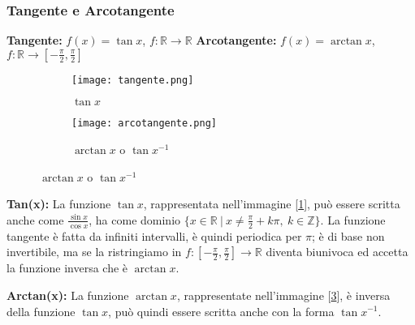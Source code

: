 \subsubsection{Tangente e Arcotangente}
\textbf{Tangente:} $f(x) = \tan{x}$, $f: \mathbb{R} \longrightarrow \mathbb{R}$ \hfill
\textbf{Arcotangente:} $f(x) = \arctan{x}$, $f: \mathbb{R} \longrightarrow [-\frac{\pi}{2}, \frac{\pi}{2}]$
\begin{figure}[h!]
    \begin{subfigure}{.5\textwidth}
        \vspace{-20pt}
        \centering
        \texttt{[image: tangente.png]}
        \vspace{-20pt}
        \caption{$\tan{x}$}
        \label{fig:tangente}
    \end{subfigure}
    \begin{subfigure}{.5\textwidth}
        \centering
        \texttt{[image: arcotangente.png]}
        \caption{$\arctan{x}$ o $\tan{x}^{-1}$}
        \label{fig:arcotangente}
    \end{subfigure}
\end{figure}
\begin{observation}
    \textbf{Tan(x):} La funzione $\tan{x}$, rappresentata nell'immagine [\ref{fig:tangente}], può essere scritta anche come $\frac{\sin{x}}{\cos{x}}$, ha come dominio $\{x \in \mathbb{R} \: | \:  x \neq \frac{\pi}{2} + k\pi, \: k \in \mathbb{Z}\}$. La funzione tangente è fatta da infiniti intervalli, è quindi periodica per $\pi$; è di base non invertibile, ma se la ristringiamo in $f: [-\frac{\pi}{2}, \frac{\pi}{2}] \longrightarrow \mathbb{R}$ diventa biunivoca ed accetta la funzione inversa che è $\arctan{x}$.
\end{observation}
\begin{observation}
    \textbf{Arctan(x):} La funzione $\arctan{x}$, rappresentate nell'immagine [\ref{fig:arcotangente}], è inversa della funzione $\tan{x}$, può quindi essere scritta anche con la forma $\tan{x}^{-1}$.
\end{observation}